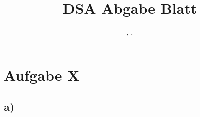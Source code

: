 \documentclass{scrartcl}
\title{DSA Abgabe Blatt \workSheet}
\author{\anton, \omid, \jannik}
\date{\dateOfFinishing }
\begin{document}
	\maketitle
	\newpage

	\section*{Aufgabe X}
	\subsection*{a)}





\end{document}
